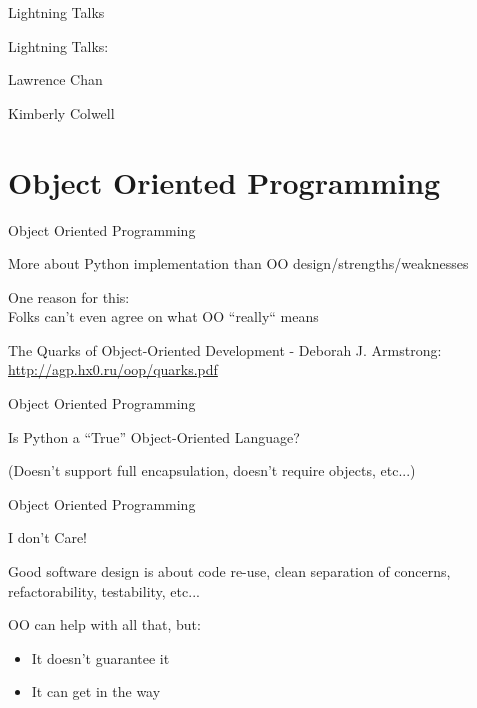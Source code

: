 \documentclass{beamer}
\begin{document}
\begin{frame}{Lightning Talks}

{\LARGE Lightning Talks:}

{\large
\vfill
Lawrence Chan

\vfill
Kimberly Colwell

}
\end{frame}

\section{Object Oriented Programming}

\begin{frame}[fragile]{Object Oriented Programming}

\vfill
 {\Large More about Python implementation than OO design/strengths/weaknesses}

\vfill
{\Large One reason for this:\\
Folks can't even agree on what OO ``really`` means}

\vfill
The Quarks of Object-Oriented Development - Deborah J. Armstrong:\\
\url{http://agp.hx0.ru/oop/quarks.pdf}

\end{frame} 

\begin{frame}[fragile]{Object Oriented Programming}

\vfill
 {\LARGE Is Python a ``True'' Object-Oriented Language?}

\vfill
{\Large (Doesn't support full encapsulation, doesn't require
objects, etc...)}

\end{frame} 

\begin{frame}[fragile]{Object Oriented Programming}

\vfill
 {\LARGE I don't Care!}

\vfill
{\Large Good software design is about code re-use, clean separation of concerns,
refactorability, testability, etc...}

\vfill
{\Large OO can help with all that, but:
\begin{itemize}
  \item It doesn't guarantee it
  \item It can get in the way
\end{itemize}
}

\end{frame} 
\end{document}

